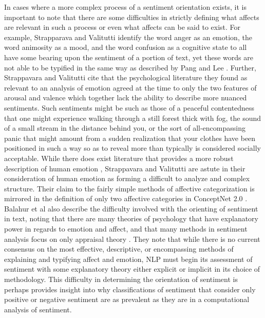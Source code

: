 \documentclass[letterpaper, 10 pt, conference]{ieeeconf}
\begin{document}
In cases where a more complex process of a sentiment orientation exists, it is important to note that there are some difficulties in strictly defining what affects are relevant in such a process or even what affects can be said to exist. For example, Strapparava and Valitutti identify the word anger as an emotion, the word animosity as a mood, and the word confusion as a cognitive state to all have some bearing upon the sentiment of a portion of text, yet these words are not able to be typified in the same way as described by Pang and Lee \textcolor{gray}{\cite{Strapparava}}. Further, Strappavara and Valitutti cite that the psychological literature they found as relevant to an analysis of emotion agreed at the time to only the two features of arousal and valence which together lack the ability to describe more nuanced sentiments. Such sentiments might be such as those of a peaceful contentedness that one might experience walking through a still forest thick with fog, the sound of a small stream in the distance behind you, or the sort of all-encompassing panic that might amount from a sudden realization that your clothes have been positioned in such a way so as to reveal more than typically is considered socially acceptable. While there does exist literature that provides a more robust description of human emotion \textcolor{gray}{\cite{CambriaSpeer}}, Strappavara and Valitutti are astute in their consideration of human emotion as forming a difficult to analyze and complex structure. Their claim to the fairly simple methods of affective categorization is mirrored in the definition of only two affective categories in ConceptNet 2.0 \textcolor{gray}{\cite{Liu}}. Balahur et al also describe the difficulty involved with the orienting of sentiment in text, noting that there are many theories of psychology that have explanatory power in regards to emotion and affect, and that many methods in sentiment analysis focus on only appraisal theory \textcolor{gray}{\cite{Balahur}}. They note that while there is no current consensus on the most effective, descriptive, or encompassing methods of explaining and typifying affect and emotion, NLP must begin its assessment of sentiment with some explanatory theory either explicit or implicit in its choice of methodology. This difficulty in determining the orientation of sentiment is perhaps provides insight into why classifications of sentiment that consider only positive or negative sentiment are as prevalent as they are in a computational analysis of sentiment.
\end{document}
